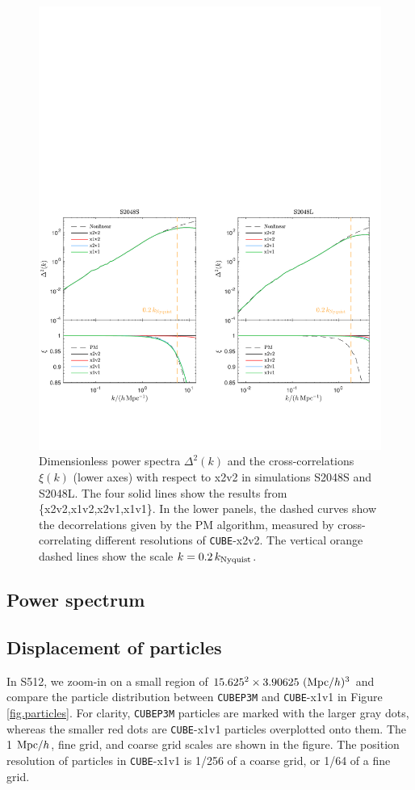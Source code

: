 \documentclass[10pt,twocolumn,preprint]{emulateapj}
\begin{document}
\begin{figure}
\centering
  \includegraphics[width=1.0\linewidth]{f9}
 \caption{Dimensionless power spectra $\Delta^2(k)$ and the cross-correlations $\xi(k)$ (lower axes) with respect to x2v2 in simulations S2048S and S2048L. The four solid lines show the results from \{x2v2,x1v2,x2v1,x1v1\}. In the lower panels, the dashed curves show the decorrelations given by the PM algorithm, measured by cross-correlating different resolutions of {\tt CUBE}-x2v2. The vertical orange dashed lines show the scale $k=0.2\, k_{\rm Nyquist}$.}
\label{fig.ccc}
\end{figure}
\subsection{Power spectrum}

\subsection{Displacement of particles}
In S512, we zoom-in on a small region of $15.625^2\times 3.90625\ ({\rm Mpc}/h)^3$ and compare the particle distribution between {\tt CUBEP3M} and {\tt CUBE}-x1v1 in Figure \ref{fig.particles}. For clarity, {\tt CUBEP3M} particles are marked with the larger gray dots, whereas the smaller red dots are {\tt CUBE}-x1v1 particles overplotted onto them. The 1 ${\rm Mpc}/h$, fine grid, and coarse grid scales are shown in the figure. The position resolution of particles in {\tt CUBE}-x1v1 is 1/256 of a coarse grid, or 1/64 of a fine grid.
\end{document}
